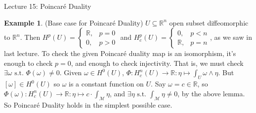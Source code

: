 \documentclass[10pt]{article}
\theoremstyle{plain}
\theoremstyle{definition}
\newtheorem{exmp}[thm]{Example} %
\newcommand{\st}{\text{ s.t. }}
\newcommand{\Real}{\mathbb{R}}
\newcommand{\man}{\mathcal{M}}
\newcommand{\cohom}[2]{H^{#1}(#2)}
\begin{document}
\begin{section}{Lecture 15: Poincar\'e Duality}
\begin{exmp}(Base case for Poincar\'e Duality)
$U \subseteq \Real^n$ open subset diffeomorphic to $\Real ^n$. Then $\cohom{p}{U} = \begin{cases} \Real,& p= 0\\ 0,& p > 0\end{cases}$ and $ H^p_c(U) = \begin{cases} 0,& p<n\\ \Real,& p =n\end{cases}$, as we saw in last lecture. To check the given Poincar\'e duality map is an isomorphism, it's enough to check $p = 0$, and enough to check injectivity. That is, we must check $\exists \omega \st \Phi(\omega) \neq  0.$ Given $\omega \in H^0(U)$, $\Phi: H^n_c(U) \to \Real : \eta \mapsto \int_U \omega \wedge \eta$. But $[\omega] \in H^0(U)$ so $\omega$ is a constant function on $U$. Say $\omega = c \in \Real$, so $\Phi(\omega) : H^n_c(U) \to \Real : \eta \mapsto c\cdot \int_\man \eta$, and $\exists \eta \st \int_\man \eta \neq 0$, by the above lemma. So Poincar\'e Duality holds in the simplest possible case.
\end{exmp}
\end{section}
\end{document}

